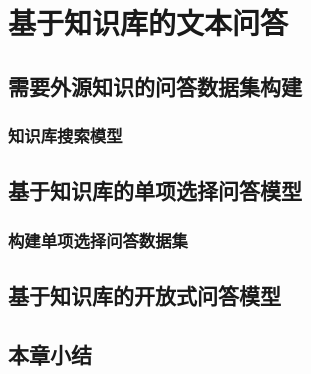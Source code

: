 
\chapter{基于知识库的文本问答}
\section{需要外源知识的问答数据集构建}

\subsection{知识库搜索模型}

\section{基于知识库的单项选择问答模型}
\subsection{构建单项选择问答数据集}

\section{基于知识库的开放式问答模型}

\section{本章小结}
